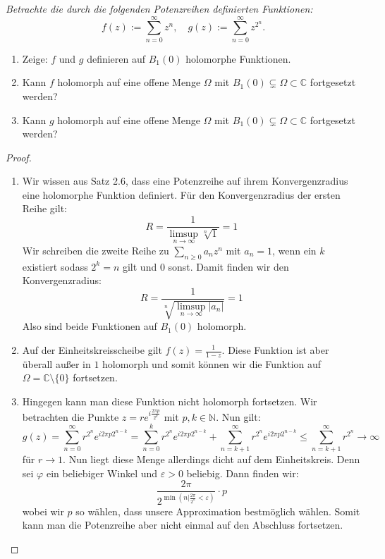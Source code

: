 \documentclass[11pt]{article}
\newcommand{\N}{\mathbb{N}}
\newcommand{\C}{\mathbb{C}}
\newenvironment{problem}[2][Beispiel]{
    \begin{trivlist}
        \item[\hskip \labelsep {\bfseries #1}\hskip \labelsep {\bfseries #2.}] \itshape}{
    \end{trivlist}\normalshape
}
\begin{document}
    \begin{problem}{4}
        Betrachte die durch die folgenden Potenzreihen definierten Funktionen:
        $$
        f(z):=\sum_{n=0}^{\infty} z^n, \quad g(z):=\sum_{n=0}^{\infty} z^{2^n} .
        $$
        \begin{enumerate}[label = (\alph*)]
            \item Zeige: $f$ und $g$ definieren auf $B_1(0)$ holomorphe Funktionen.
            \item Kann $f$ holomorph auf eine offene Menge $\Omega$ mit $B_1(0) \subsetneq \Omega \subset \mathbb{C}$
        fortgesetzt werden?
            \item Kann $g$ holomorph auf eine offene Menge $\Omega$ mit $B_1(0) \subsetneq \Omega \subset \mathbb{C}$
        fortgesetzt werden?
        \end{enumerate}
    \end{problem}

    \begin{proof}
        \begin{enumerate}[label = (\alph*)]
            \item Wir wissen aus Satz 2.6, dass eine Potenzreihe auf ihrem Konvergenzradius eine holomorphe
            Funktion definiert. Für den Konvergenzradius der ersten Reihe gilt:
            $$R = \frac{1}{\limsup_{n\to\infty}\sqrt[n]{1}} = 1$$
            Wir schreiben die zweite Reihe zu $\sum_{n\geq 0} a_n z^{n}$ mit $a_n = 1$, wenn ein $k$
            existiert sodass $2^k = n$ gilt und $0$ sonst. Damit finden wir den Konvergenzradius:
            $$R = \frac{1}{\sqrt[n]{\limsup_{n\to\infty}|a_n|}} = 1$$
            Also sind beide Funktionen auf $B_1(0)$ holomorph.
            \item Auf der Einheitskreisscheibe gilt $f(z) = \frac{1}{1-z}$. Diese Funktion ist
            aber überall außer in $1$ holomorph und somit können wir die Funktion auf $\Omega = \C\setminus
            \{0\}$ fortsetzen.
            \item Hingegen kann man diese Funktion nicht holomorph fortsetzen. Wir betrachten die
            Punkte $z = re^{i\frac{2\pi p}{2^k}}$ mit $p,k\in\N$. Nun gilt:
            $$g(z)=\sum_{n=0}^{\infty} r^{2^n}e^{i2\pi p 2^{n-k}} = \sum_{n=0}^{k} r^{2^n}e^{i2\pi p 2^{n-k}}
            +\sum_{n=k+1}^{\infty} r^{2^n}e^{i2\pi p 2^{n-k}}\leq \sum_{n=k+1}^{\infty} r^{2^n} \to \infty$$
            für $r\to 1$. Nun liegt diese Menge allerdings dicht auf dem Einheitskreis. Denn sei
            $\varphi$ ein beliebiger Winkel und $\varepsilon>0$ beliebig. Dann finden wir:
            $$\frac{2\pi}{2^{\min(n| \frac{2\pi}{2^n}<\varepsilon)}}\cdot p$$
            wobei wir $p$ so wählen, dass unsere Approximation bestmöglich wählen. Somit kann man die Potenzreihe
            aber nicht einmal auf den Abschluss fortsetzen.
        \end{enumerate}
    \end{proof}
\end{document}
